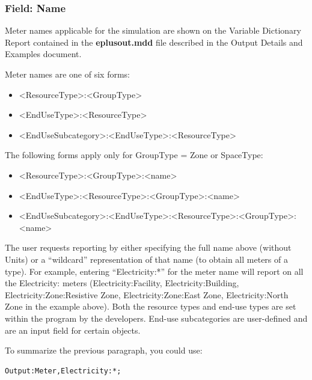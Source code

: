 \subsubsection{Field: Name}\label{field-name-1-036}

Meter names applicable for the simulation are shown on the Variable Dictionary Report contained in the \textbf{eplusout.mdd} file described in the Output Details and Examples document.

Meter names are one of six forms:

\begin{itemize}
\item
  \textless{}ResourceType\textgreater{}:\textless{}GroupType\textgreater{}
\item
  \textless{}EndUseType\textgreater{}:\textless{}ResourceType\textgreater{}
\item
  \textless{}EndUseSubcategory\textgreater{}:\textless{}EndUseType\textgreater{}:\textless{}ResourceType\textgreater{}
\end{itemize}
The following forms apply only for GroupType = Zone or SpaceType:
\begin{itemize}
\item
  \textless{}ResourceType\textgreater{}:\textless{}GroupType\textgreater{}:\textless{}name\textgreater{}
\item
  \textless{}EndUseType\textgreater{}:\textless{}ResourceType\textgreater{}:\textless{}GroupType\textgreater{}:\textless{}name\textgreater{}
\item
  \textless{}EndUseSubcategory\textgreater{}:\textless{}EndUseType\textgreater{}:\textless{}ResourceType\textgreater{}:\textless{}GroupType\textgreater{}:\textless{}name\textgreater{}
\end{itemize}

The user requests reporting by either specifying the full name above (without Units) or a ``wildcard'' representation of that name (to obtain all meters of a type). For example, entering ``Electricity:*'' for the meter name will report on all the Electricity: meters (Electricity:Facility, Electricity:Building, Electricity:Zone:Resistive Zone, Electricity:Zone:East Zone, Electricity:North Zone in the example above). Both the resource types and end-use types are set within the program by the developers. End-use subcategories are user-defined and are an input field for certain objects.

To summarize the previous paragraph, you could use:

\begin{lstlisting}
Output:Meter,Electricity:*;
\end{lstlisting}

